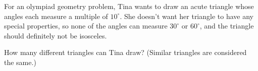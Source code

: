 For an olympiad geometry problem, Tina wants to draw an acute triangle whose angles each measure a multiple of $10^{\circ}$. She doesn't want her triangle to have any special properties, so none of the angles can measure $30^{\circ}$ or $60^{\circ}$, and the triangle should definitely not be isosceles.

How many different triangles can Tina draw? (Similar triangles are considered the same.)
